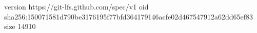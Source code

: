 version https://git-lfs.github.com/spec/v1
oid sha256:150071581d790be3176195f77bfd364179146acfe02d467547912a62dd65ef83
size 14910
